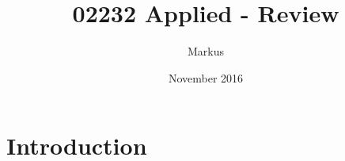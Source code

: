\documentclass{article}
\title{02232 Applied - Review}
\author{Markus }
\date{November 2016}
\begin{document}
\maketitle

\section{Introduction}
\end{document}
